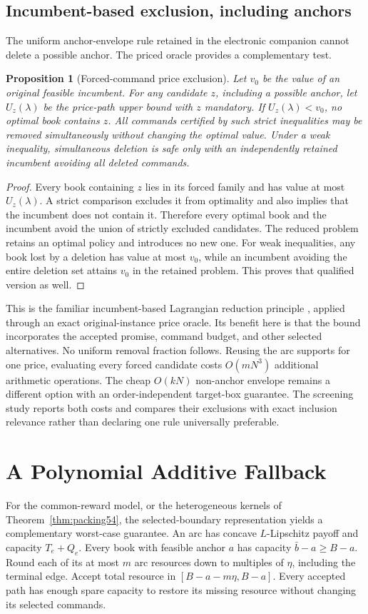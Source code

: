\documentclass[11pt,letterpaper]{article}
\newtheorem{proposition}[theorem]{Proposition}
\theoremstyle{definition}\newtheorem{remark}[theorem]{Remark}
\begin{document}
\subsection{Incumbent-based exclusion, including anchors}\label{sec:anchor54}
The uniform anchor-envelope rule retained in the electronic companion cannot delete a possible anchor. The priced oracle provides a complementary test.
\begin{proposition}[Forced-command price exclusion]\label{prop:fix54}
Let $v_0$ be the value of an original feasible incumbent. For any candidate $z$, including a possible anchor, let $U_z(\lambda)$ be the price-path upper bound with $z$ mandatory. If $U_z(\lambda)<v_0$, no optimal book contains $z$. All commands certified by such strict inequalities may be removed simultaneously without changing the optimal value. Under a weak inequality, simultaneous deletion is safe only with an independently retained incumbent avoiding all deleted commands.
\end{proposition}
\begin{proof}
Every book containing $z$ lies in its forced family and has value at most $U_z(\lambda)$. A strict comparison excludes it from optimality and also implies that the incumbent does not contain it. Therefore every optimal book and the incumbent avoid the union of strictly excluded candidates. The reduced problem retains an optimal policy and introduces no new one. For weak inequalities, any book lost by a deletion has value at most $v_0$, while an incumbent avoiding the entire deletion set attains $v_0$ in the retained problem. This proves that qualified version as well.
\end{proof}

This is the familiar incumbent-based Lagrangian reduction principle \citep{BeasleyChristofides1989,Fisher1981}, applied through an exact original-instance price oracle. Its benefit here is that the bound incorporates the accepted promise, command budget, and other selected alternatives. No uniform removal fraction follows. Reusing the arc supports for one price, evaluating every forced candidate costs $O(mN^3)$ additional arithmetic operations. The cheap $O(kN)$ non-anchor envelope remains a different option with an order-independent target-box guarantee. The screening study reports both costs and compares their exclusions with exact inclusion relevance rather than declaring one rule universally preferable.
\section{A Polynomial Additive Fallback}\label{sec:uniform54}
For the common-reward model, or the heterogeneous kernels of Theorem~\ref{thm:packing54}, the selected-boundary representation yields a complementary worst-case guarantee. An arc has concave $L$-Lipschitz payoff and capacity $T_e+Q_e$. Every book with feasible anchor $a$ has capacity $\bar b-a\geq B-a$. Round each of its at most $m$ arc resources down to multiples of $\eta$, including the terminal edge. Accept total resource in $[B-a-m\eta,B-a]$. Every accepted path has enough spare capacity to restore its missing resource without changing its selected commands.
\end{document}
